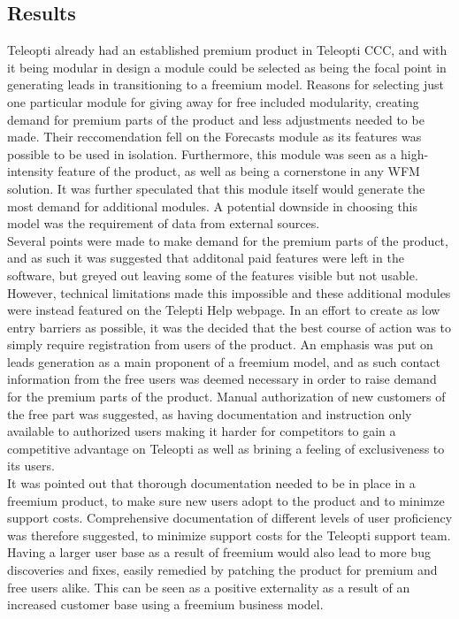 {\subsection{Results}
Teleopti already had an established premium product in Teleopti CCC, and with it being modular in design a module could be selected as being the focal point in generating leads in transitioning to a freemium model. Reasons for selecting just one particular module for giving away for free included modularity, creating demand for premium parts of the product and less adjustments needed to be made. Their reccomendation fell on the Forecasts module as its features was possible to be used in isolation. Furthermore, this module was seen as a high-intensity feature of the product, as well as being a cornerstone in any WFM solution. It was further speculated that this module itself would generate the most demand for additional modules. A potential downside in choosing this model was the requirement of data from external sources.
\newline
\\
Several points were made to make demand for the premium parts of the product, and as such it was suggested that additonal paid features were left in the software, but greyed out leaving some of the features visible but not usable. However, technical limitations made this impossible and these additional modules were instead featured on the Telepti Help webpage. In an effort to create as low entry barriers as possible, it was the decided that the best course of action was to simply require registration from users of the product. An emphasis was put on leads generation as a main proponent of a freemium model, and as such contact information from the free users was deemed necessary in order to raise demand for the premium parts of the product. Manual authorization of new customers of the free part was suggested, as having documentation and instruction only available to authorized users making it harder for competitors to gain a competitive advantage on Teleopti as well as brining a feeling of exclusiveness to its users.
\newline
\\
It was pointed out that thorough documentation needed to be in place in a freemium product, to make sure new users adopt to the product and to minimze support costs. Comprehensive documentation of different levels of user proficiency was therefore suggested, to minimize support costs for the Teleopti support team. Having a larger user base as a result of freemium would also lead to more bug discoveries and fixes, easily remedied by patching the product for premium and free users alike. This can be seen as a positive externality as a result of an increased customer base using a freemium business model. 
}
